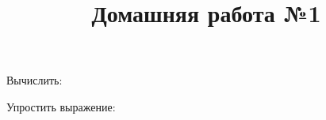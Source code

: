 \newpage
\title{Домашняя работа №1}
\begin{listofex}
	\item {}
	\item {}
	\item {}
	\item {}
	\item {}
	
	\item Вычислить:
	\begin{enumcols}[itemcolumns=3]
		\item {}
		\item {}
		\item {}
	\end{enumcols}
	\item {}
	\item {}
	\item {}
	\item {}
	\item {}
	
	\item Упростить выражение:
	\begin{enumcols}[itemcolumns=2]
		\item {}
		\item {}
	\end{enumcols}
	\item {}
\end{listofex}
